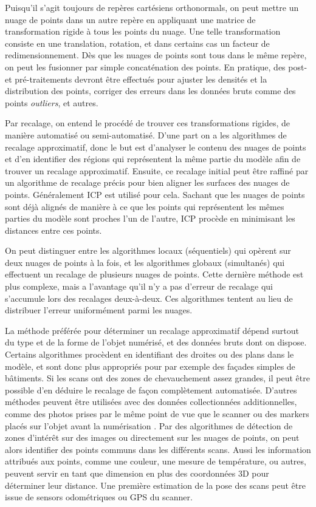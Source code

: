 \documentclass[a4paper,10pt]{scrreprt}
\begin{document}
Puisqu'il s'agit toujours de repères cartésiens orthonormals, on peut mettre un nuage de points dans un autre repère en appliquant une matrice de transformation rigide à tous les points du nuage. Une telle transformation consiste en une translation, rotation, et dans certains cas un facteur de redimensionnement. Dès que les nuages de points sont tous dans le même repère, on peut les fusionner par simple concaténation des points. En pratique, des post- et pré-traitements devront être effectués pour ajuster les densités et la distribution des points, corriger des erreurs dans les données bruts comme des points \emph{outliers}, et autres.

Par recalage, on entend le procédé de trouver ces transformations rigides, de manière automatisé ou semi-automatisé. D'une part on a les algorithmes de recalage approximatif, donc le but est d'analyser le contenu des nuages de points et d'en identifier des régions qui représentent la même partie du modèle afin de trouver un recalage approximatif. Ensuite, ce recalage initial peut être raffiné par un algorithme de recalage précis pour bien aligner les surfaces des nuages de points. Généralement ICP est utilisé pour cela. Sachant que les nuages de points sont déjà alignés de manière à ce que les points qui représentent les mêmes parties du modèle sont proches l'un de l'autre, ICP procède en minimisant les distances entre ces points.

On peut distinguer entre les algorithmes locaux (séquentiels) qui opèrent sur deux nuages de points à la fois, et les algorithmes globaux (simultanés) qui effectuent un recalage de plusieurs nuages de points. Cette dernière méthode est plus complexe, mais a l'avantage qu'il n'y a pas d'erreur de recalage qui s'accumule lors des recalages deux-à-deux. Ces algorithmes tentent au lieu de distribuer l'erreur uniformément parmi les nuages.

La méthode préférée pour déterminer un recalage approximatif dépend surtout du type et de la forme de l'objet numérisé, et des données bruts dont on dispose. Certains algorithmes procèdent en identifiant des droites \cite{Lich2011} ou des plans \cite{Dold2006} dans le modèle, et sont donc plus appropriés pour par exemple des façades simples de bâtiments. Si les scans ont des zones de chevauchement assez grandes, il peut être possible d'en déduire le recalage de façon complètement automatisée. D'autres méthodes peuvent être utilisées avec des données collectionnées additionnelles, comme des photos prises par le même point de vue que le scanner \cite{Tour2009} ou des markers placés sur l'objet avant la numérisation \cite{Mati2011}. Par des algorithmes de détection de zones d'intérêt \cite{Tuyt2007} sur des images ou directement sur les nuages de points, on peut alors identifier des points communs dans les différents scans. Aussi les information attribués aux points, comme une couleur, une mesure de température, ou autres, peuvent servir en tant que dimension en plus des coordonnées 3D pour déterminer leur distance. Une première estimation de la pose des scans peut être issue de sensors odométriques ou GPS du scanner.
\end{document}
